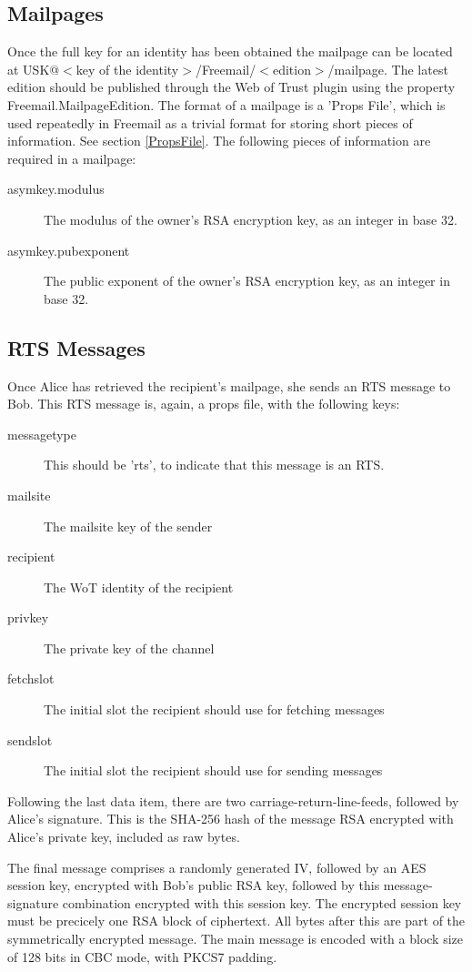 \documentclass[12pt,a4paper]{article}
\begin{document}
\subsection{Mailpages}
Once the full key for an identity has been obtained the mailpage can be located at
USK@$<$key of the identity$>$/Freemail/$<$edition$>$/mailpage. The latest edition should be published
through the Web of Trust plugin using the property Freemail.MailpageEdition. The format of a
mailpage is a 'Props File', which is used repeatedly in Freemail as a trivial format for storing
short pieces of information. See section \ref{PropsFile}.
The following pieces of information are required in a mailpage:

\begin{description}
\item[asymkey.modulus] The modulus of the owner's RSA encryption key, as an integer in base 32.
\item[asymkey.pubexponent] The public exponent of the owner's RSA encryption key, as an integer in
	base 32.
\end{description}

\subsection{RTS Messages}
Once Alice has retrieved the recipient's mailpage, she sends an RTS message to Bob. This RTS message
is, again, a props file, with the following keys:

\begin{description}
\item[messagetype] This should be 'rts', to indicate that this message is an RTS.
\item[mailsite] The mailsite key of the sender
\item[recipient] The WoT identity of the recipient
\item[privkey] The private key of the channel
\item[fetchslot] The initial slot the recipient should use for fetching messages
\item[sendslot] The initial slot the recipient should use for sending messages
\end{description}

Following the last data item, there are two carriage-return-line-feeds, followed by Alice's
signature. This is the SHA-256 hash of the message RSA encrypted with Alice's private key, included
as raw bytes.

The final message comprises a randomly generated IV, followed by an AES session key, encrypted with
Bob's public RSA key, followed by this message-signature combination encrypted with this session
key. The encrypted session key must be precicely one RSA block of ciphertext. All bytes after this
are part of the symmetrically encrypted message. The main message is encoded with a block size of
128 bits in CBC mode, with PKCS7 padding.
\end{document}
